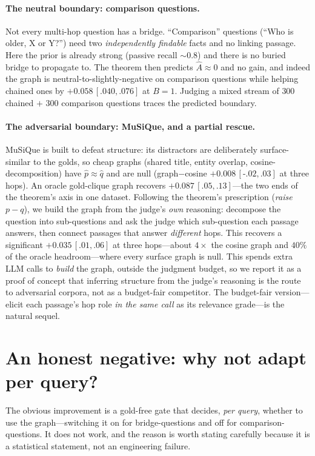 \documentclass[11pt]{article}
\theoremstyle{plain}
\theoremstyle{definition}
\theoremstyle{remark}
\begin{document}
\paragraph{The neutral boundary: comparison questions.} Not every multi-hop question has a bridge. ``Comparison''
questions (``Who is older, X or Y?'') need two \emph{independently findable} facts and no linking passage. Here the
prior is already strong (passive recall $\sim0.8$) and there is no buried bridge to propagate to. The theorem then
predicts $\widehat A\approx0$ and no gain, and indeed the graph is neutral-to-slightly-negative on comparison
questions while helping chained ones by $+0.058\,[.040,.076]$ at $B=1$. Judging a mixed stream of $300$ chained
$+$ $300$ comparison questions traces the predicted boundary.

\paragraph{The adversarial boundary: MuSiQue, and a partial rescue.} MuSiQue is built to defeat structure: its
distractors are deliberately surface-similar to the golds, so cheap graphs (shared title, entity overlap,
cosine-decomposition) have $\hat p\approx\hat q$ and are null (graph$-$cosine $+0.008\,[\text{-}.02,.03]$ at three
hops). An oracle gold-clique graph recovers $+0.087\,[.05,.13]$---the two ends of the theorem's axis in one dataset.
Following the theorem's prescription (\emph{raise $p-q$}), we build the graph from the judge's \emph{own} reasoning:
decompose the question into sub-questions and ask the judge which sub-question each passage answers, then connect
passages that answer \emph{different} hops. This recovers a significant $+0.035\,[.01,.06]$ at three hops---about
$4\times$ the cosine graph and $40\%$ of the oracle headroom---where every surface graph is null. This spends extra
LLM calls to \emph{build} the graph, outside the judgment budget, so we report it as a proof of concept that
inferring structure from the judge's reasoning is the route to adversarial corpora, not as a budget-fair
competitor. The budget-fair version---elicit each passage's hop role \emph{in the same call} as its relevance
grade---is the natural sequel.

\section{An honest negative: why not adapt per query?}\label{sec:negative}
The obvious improvement is a gold-free gate that decides, \emph{per query}, whether to use the graph---switching it
on for bridge-questions and off for comparison-questions. It does not work, and the reason is worth stating
carefully because it is a statistical statement, not an engineering failure.
\end{document}
